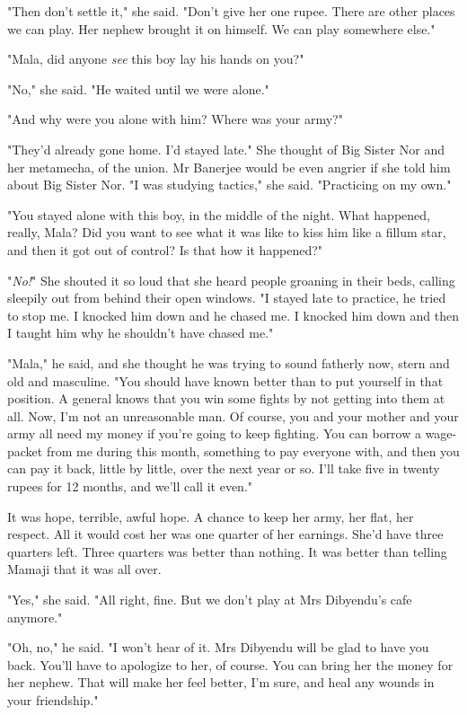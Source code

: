 "Then don't settle it," she said. "Don't give her one rupee. There
are other places we can play. Her nephew brought it on himself. We
can play somewhere else."

"Mala, did anyone \emph{see} this boy lay his hands on you?"

"No," she said. "He waited until we were alone."

"And why were you alone with him? Where was your army?"

"They'd already gone home. I'd stayed late." She thought of Big
Sister Nor and her metamecha, of the union. Mr Banerjee would be
even angrier if she told him about Big Sister Nor. "I was studying
tactics," she said. "Practicing on my own."

"You stayed alone with this boy, in the middle of the night. What
happened, really, Mala? Did you want to see what it was like to
kiss him like a fillum star, and then it got out of control? Is
that how it happened?"

"\emph{No!}" She shouted it so loud that she heard people groaning
in their beds, calling sleepily out from behind their open windows.
"I stayed late to practice, he tried to stop me. I knocked him down
and he chased me. I knocked him down and then I taught him why he
shouldn't have chased me."

"Mala," he said, and she thought he was trying to sound fatherly
now, stern and old and masculine. "You should have known better
than to put yourself in that position. A general knows that you win
some fights by not getting into them at all. Now, I'm not an
unreasonable man. Of course, you and your mother and your army all
need my money if you're going to keep fighting. You can borrow a
wage-packet from me during this month, something to pay everyone
with, and then you can pay it back, little by little, over the next
year or so. I'll take five in twenty rupees for 12 months, and
we'll call it even."

It was hope, terrible, awful hope. A chance to keep her army, her
flat, her respect. All it would cost her was one quarter of her
earnings. She'd have three quarters left. Three quarters was better
than nothing. It was better than telling Mamaji that it was all
over.

"Yes," she said. "All right, fine. But we don't play at Mrs
Dibyendu's cafe anymore."

"Oh, no," he said. "I won't hear of it. Mrs Dibyendu will be glad
to have you back. You'll have to apologize to her, of course. You
can bring her the money for her nephew. That will make her feel
better, I'm sure, and heal any wounds in your friendship."

